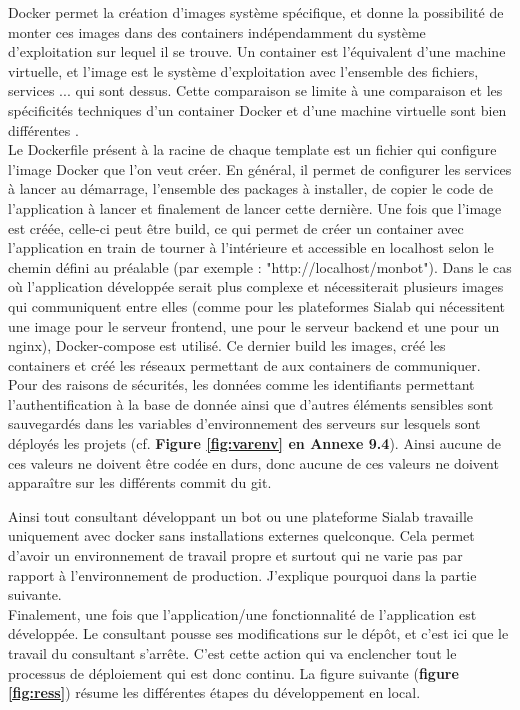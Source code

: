 \documentclass{article} %
\begin{document}
{Docker permet la création d'images système spécifique, et donne la possibilité de monter ces images dans des containers indépendamment du système d'exploitation sur lequel il se trouve. Un container est l'équivalent d'une machine virtuelle, et l'image est le système d'exploitation avec l'ensemble des fichiers, services ... qui sont dessus. Cette comparaison se limite à une comparaison et les spécificités techniques d'un container Docker et d'une machine virtuelle sont bien différentes \cite{comp}.\\

Le Dockerfile présent à la racine de chaque template est un fichier qui configure l'image Docker que l'on veut créer. En général, il permet de configurer les services à lancer au démarrage, l'ensemble des packages à installer, de copier le code de l'application à lancer et finalement de lancer cette dernière. Une fois que l'image est créée, celle-ci peut être build, ce qui permet de créer un container avec l'application en train de tourner à l'intérieure et accessible en localhost selon le chemin défini au préalable (par exemple : "http://localhost/monbot"). Dans le cas où l'application développée serait plus complexe et nécessiterait plusieurs images qui communiquent entre elles (comme pour les plateformes Sialab qui nécessitent une image pour le serveur frontend, une pour le serveur backend et une pour un nginx), Docker-compose est utilisé. Ce dernier  build les images, créé les containers et créé les réseaux permettant de aux containers de communiquer. \\

Pour des raisons de sécurités, les données comme les identifiants permettant l'authentification à la base de donnée ainsi que d'autres éléments sensibles sont sauvegardés dans les variables d'environnement des serveurs sur lesquels sont déployés les projets (cf. \textbf{Figure \ref{fig:varenv} en Annexe 9.4}). Ainsi aucune de ces valeurs ne doivent être codée en durs, donc aucune de ces valeurs ne doivent apparaître sur les différents commit du git.

Ainsi tout consultant développant un bot ou une plateforme Sialab travaille uniquement avec docker sans installations externes quelconque. Cela permet d'avoir un environnement de travail propre et surtout qui ne varie pas par rapport à l'environnement de production. J'explique pourquoi dans la partie suivante.\\

Finalement, une fois que l'application/une fonctionnalité de l'application est développée. Le consultant pousse ses modifications sur le dépôt, et c'est ici que le travail du consultant s'arrête. C'est cette action qui va enclencher tout le processus de déploiement qui est donc continu. La figure suivante (\textbf{figure \ref{fig:ress}}) résume les différentes étapes du développement en local.

}
\end{document}
